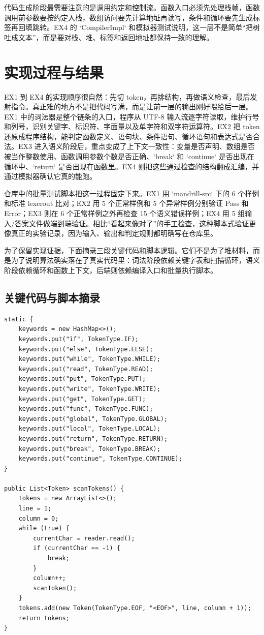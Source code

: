 \documentclass[UTF8,a4paper,12pt]{ctexart}
\begin{document}
代码生成阶段最需要注意的是调用约定和控制流。函数入口必须先处理栈帧，函数调用前参数要按约定入栈，数组访问要先计算地址再读写，条件和循环要先生成标签再回填跳转。EX4 的 `CompilerImpl` 和模拟器测试说明，这一层不是简单“把树吐成文本”，而是要对栈、堆、标签和返回地址都保持一致的理解。

\section{实现过程与结果}
EX1 到 EX4 的实现顺序很自然：先切 token，再排结构，再做语义检查，最后发射指令。真正难的地方不是把代码写满，而是让前一层的输出刚好喂给后一层。EX1 中的词法器是整个链条的入口，程序从 UTF-8 输入流逐字符读取，维护行号和列号，识别关键字、标识符、字面量以及单字符和双字符运算符。EX2 把 token 还原成程序结构，能判定函数定义、语句块、条件语句、循环语句和表达式是否合法。EX3 进入语义阶段后，重点变成了上下文一致性：变量是否声明、数组是否被当作整数使用、函数调用参数个数是否正确、`break` 和 `continue` 是否出现在循环中、`return` 是否出现在函数里。EX4 则把这些通过检查的结构翻成汇编，并通过模拟器确认它真的能跑。

仓库中的批量测试脚本把这一过程固定下来。EX1 用 `mandrill-src` 下的 6 个样例和标准 lexerout 比对；EX2 用 5 个正常样例和 5 个异常样例分别验证 Pass 和 Error；EX3 则在 6 个正常样例之外再检查 15 个语义错误样例；EX4 用 5 组输入/答案文件做端到端验证。相比“看起来像对了”的手工检查，这种脚本式验证更像真正的实验记录，因为输入、输出和判定规则都明确写在仓库里。

为了保留实现证据，下面摘录三段关键代码和脚本逻辑。它们不是为了堆材料，而是为了说明算法确实落在了真实代码里：词法阶段依赖关键字表和扫描循环，语义阶段依赖循环和函数上下文，后端则依赖编译入口和批量执行脚本。

\subsection*{关键代码与脚本摘录}
\begin{lstlisting}[style=mandrillcode,caption={EX1 词法分析器中的关键字表与扫描循环},label={lst:lexer-code}]
static {
    keywords = new HashMap<>();
    keywords.put("if", TokenType.IF);
    keywords.put("else", TokenType.ELSE);
    keywords.put("while", TokenType.WHILE);
    keywords.put("read", TokenType.READ);
    keywords.put("put", TokenType.PUT);
    keywords.put("write", TokenType.WRITE);
    keywords.put("get", TokenType.GET);
    keywords.put("func", TokenType.FUNC);
    keywords.put("global", TokenType.GLOBAL);
    keywords.put("local", TokenType.LOCAL);
    keywords.put("return", TokenType.RETURN);
    keywords.put("break", TokenType.BREAK);
    keywords.put("continue", TokenType.CONTINUE);
}

public List<Token> scanTokens() {
    tokens = new ArrayList<>();
    line = 1;
    column = 0;
    while (true) {
        currentChar = reader.read();
        if (currentChar == -1) {
            break;
        }
        column++;
        scanToken();
    }
    tokens.add(new Token(TokenType.EOF, "<EOF>", line, column + 1));
    return tokens;
}
\end{lstlisting}
\end{document}
